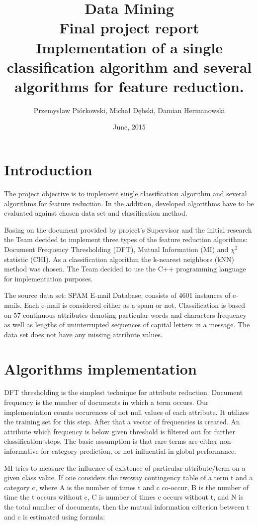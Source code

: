 \documentclass[12pt,a4paper]{report}
\title{Data Mining\\Final project report\\
	\large Implementation of a single classification algorithm and several algorithms for feature reduction.}
\date{June, 2015}
\author{Przemysław Piórkowski, Michał Dębski, Damian Hermanowski}
\begin{document}
\maketitle 
\tableofcontents
\chapter{Introduction}
The project objective is to implement single classification algorithm and several algorithms for feature reduction. In the addition, developed algorithms have to be evaluated against chosen data set and classification method.

Basing on the document provided by project's Supervisor and the initial research the Team decided to implement three types of the feature reduction algorithms: Document Frequency Thresholding (DFT), Mutual Information (MI) and \({\chi}^2\) statistic (CHI). As a classification algorithm the k-nearest neighbors (kNN) method was chosen. The Team decided to use the C++ programming language for implementation purposes.

The source data set: SPAM E-mail Database, consists of 4601 instances of e-mails. Each e-mail is considered either as a spam or not. Classification is based on 57 continuous attributes denoting particular words and characters frequency as well as lengths of uninterrupted sequences of capital letters in a message. The data set does not have any missing attribute values.

\chapter{Algorithms implementation}
DFT thresholding is the simplest technique for attribute
reduction. Document frequency is the number of documents in
which a term occurs. Our implementation counts occurences of not null values of each attribute. It utilizes the training set for this step. After that a vector of frequencies is created. An attribute which frequency is below given threshold is filtered out for further classification steps. The basic assumption is that rare
terms are either non-informative for category prediction,
or not influential in global performance.



MI tries to measure the influence of existence of particular attribute/term on a given class value. If one considers the twoway contingency table of a term t and a category c, where A is the number of times t and c co-occur, B is the number of time the t occurs without c, C is number of times c occurs without t, and N is the total number of documents, then the mutual information criterion between t and c is estimated using formula:
\end{document}
